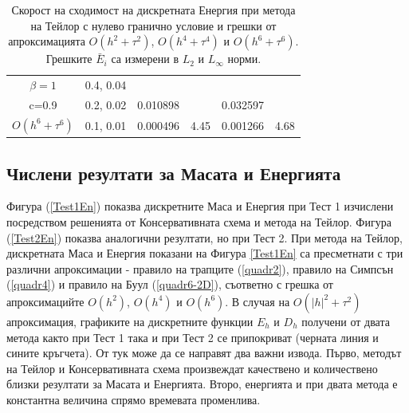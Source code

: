 \documentclass{article}
\newcommand{\rf}[1]{(\ref{#1})}
\begin{document}
\begin{table}[ht]
\begin{tabular}{||c|l|ll|ll||}
    \hline
  $\beta=1$     &0.4, 0.04   &            &          &                  &      \\
      c=0.9                    &0.2, 0.02   &0.010898 &           & 0.032597      &       \\
     $O(h^6+ \tau^6)$ &0.1, 0.01 & 0.000496 &4.45 & 0.001266  & 4.68        \\
	   \hline
			\hline 
		\end{tabular}
		\caption{Скорост на сходимост на дискретната Енергия при метода на Тейлор с нулево гранично условие и грешки от апроксимацията $O(h^{2} + \tau^2 )$, $O(h^{4} + \tau^4 )$ и $O(h^{6} + \tau^6 )$. Грешките $\bar E_i$ са измерени в $L_2$ и $L_\infty$ норми.}
\label{tableB}
\end{table}
\FloatBarrier
\subsection{Числени резултати за Масата и Енергията}
Фигура \rf{Test1En} показва дискретните Маса и Енергия при Тест 1 изчислени посредством решенията от Консервативната схема и метода на Тейлор. 
Фигура \rf{Test2En} показва аналогични резултати, но при Тест 2. При метода на Тейлор, дискретната Маса и Енергия показани на Фигура \ref{Test1En} са пресметнати с три различни апроксимации - правило на трапците \rf{quadr2}, правило на Симпсън \rf{quadr4} и правило на Буул \rf{quadr6-2D}, съответно с грешка от апроксимацийте $O(h^2)$, $O(h^4)$ и $O(h^6)$. В случая на $O(|h|^2 +\tau^2)$ апроксимация, графиките на дискретните функции $E_h$ и $D_h$ получени от двата метода както при Тест 1 така и при Тест 2 се припокриват (черната линия и сините кръгчета). От тук може да се направят два важни извода. Първо, методът на Тейлор и Консервативната схема произвеждат качествено и количествено близки резултати за Масата и Енергията. Второ, енергията и при двата метода е константна величина спрямо времевата променлива. 
\end{document}
